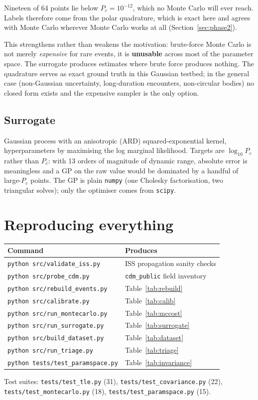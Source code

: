 \documentclass[11pt]{article}
\newcommand{\Pc}{P_c}
\begin{document}
Nineteen of 64 points lie below $\Pc = 10^{-12}$, which no Monte Carlo
will ever reach. Labels therefore come from the polar quadrature, which is
exact here and agrees with Monte Carlo wherever Monte Carlo works at all
(Section~\ref{sec:phase2}).

This strengthens rather than weakens the motivation: brute-force Monte
Carlo is not merely \emph{expensive} for rare events, it is
\textbf{unusable} across most of the parameter space. The surrogate
produces estimates where brute force produces nothing. The quadrature
serves as exact ground truth in this Gaussian testbed; in the general case
(non-Gaussian uncertainty, long-duration encounters, non-circular bodies)
no closed form exists and the expensive sampler is the only option.

\subsection{Surrogate}

Gaussian process with an anisotropic (ARD) squared-exponential kernel,
hyperparameters by maximising the log marginal likelihood. Targets are
$\log_{10}\Pc$ rather than $\Pc$: with 13 orders of magnitude of dynamic
range, absolute error is meaningless and a GP on the raw value would be
dominated by a handful of large-$\Pc$ points. The GP is plain
\texttt{numpy} (one Cholesky factorisation, two triangular solves); only
the optimiser comes from \texttt{scipy}.





\section{Reproducing everything}\label{sec:repro}

\begin{longtable}{p{} p{}}
\toprule
\textbf{Command} & \textbf{Produces} \\
\midrule
\endhead
\texttt{python src/validate\_iss.py}    & ISS propagation sanity checks \\
\texttt{python src/probe\_cdm.py}       & \texttt{cdm\_public} field inventory \\
\texttt{python src/rebuild\_events.py}  & Table~\ref{tab:rebuild} \\
\texttt{python src/calibrate.py}        & Table~\ref{tab:calib} \\
\texttt{python src/run\_montecarlo.py}  & Table~\ref{tab:mccost} \\
\texttt{python src/run\_surrogate.py}   & Table~\ref{tab:surrogate} \\
\texttt{python src/build\_dataset.py}   & Table~\ref{tab:dataset} \\
\texttt{python src/run\_triage.py}      & Table~\ref{tab:triage} \\
\texttt{python tests/test\_paramspace.py} & Table~\ref{tab:invariance} \\
\bottomrule
\end{longtable}

Test suites: \texttt{tests/test\_tle.py} (31),
\texttt{tests/test\_covariance.py} (22),
\texttt{tests/test\_montecarlo.py} (18),
\texttt{tests/test\_paramspace.py} (15).
\end{document}
